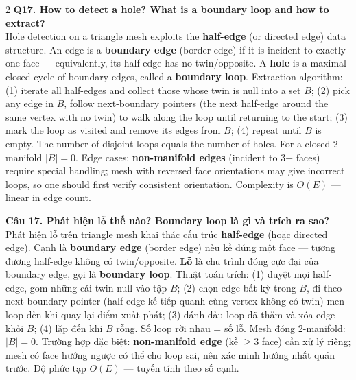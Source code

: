 \begin{paracol}{2}
\textbf{Q17. How to detect a hole? What is a boundary loop and how to extract?}\\
Hole detection on a triangle mesh exploits the \textbf{half-edge} (or directed edge) data structure. An edge is a \textbf{boundary edge} (border edge) if it is incident to exactly one face — equivalently, its half-edge has no twin/opposite. A \textbf{hole} is a maximal closed cycle of boundary edges, called a \textbf{boundary loop}. Extraction algorithm: (1) iterate all half-edges and collect those whose twin is null into a set $B$; (2) pick any edge in $B$, follow next-boundary pointers (the next half-edge around the same vertex with no twin) to walk along the loop until returning to the start; (3) mark the loop as visited and remove its edges from $B$; (4) repeat until $B$ is empty. The number of disjoint loops equals the number of holes. For a closed 2-manifold $|B| = 0$. Edge cases: \textbf{non-manifold edges} (incident to 3+ faces) require special handling; mesh with reversed face orientations may give incorrect loops, so one should first verify consistent orientation. Complexity is $O(E)$ — linear in edge count.

\switchcolumn

\textbf{Câu 17. Phát hiện lỗ thế nào? Boundary loop là gì và trích ra sao?}\\
Phát hiện lỗ trên triangle mesh khai thác cấu trúc \textbf{half-edge} (hoặc directed edge). Cạnh là \textbf{boundary edge} (border edge) nếu kề đúng một face — tương đương half-edge không có twin/opposite. \textbf{Lỗ} là chu trình đóng cực đại của boundary edge, gọi là \textbf{boundary loop}. Thuật toán trích: (1) duyệt mọi half-edge, gom những cái twin null vào tập $B$; (2) chọn edge bất kỳ trong $B$, đi theo next-boundary pointer (half-edge kế tiếp quanh cùng vertex không có twin) men loop đến khi quay lại điểm xuất phát; (3) đánh dấu loop đã thăm và xóa edge khỏi $B$; (4) lặp đến khi $B$ rỗng. Số loop rời nhau = số lỗ. Mesh đóng 2-manifold: $|B| = 0$. Trường hợp đặc biệt: \textbf{non-manifold edge} (kề $\ge 3$ face) cần xử lý riêng; mesh có face hướng ngược có thể cho loop sai, nên xác minh hướng nhất quán trước. Độ phức tạp $O(E)$ — tuyến tính theo số cạnh.

\switchcolumn*


\end{paracol}
